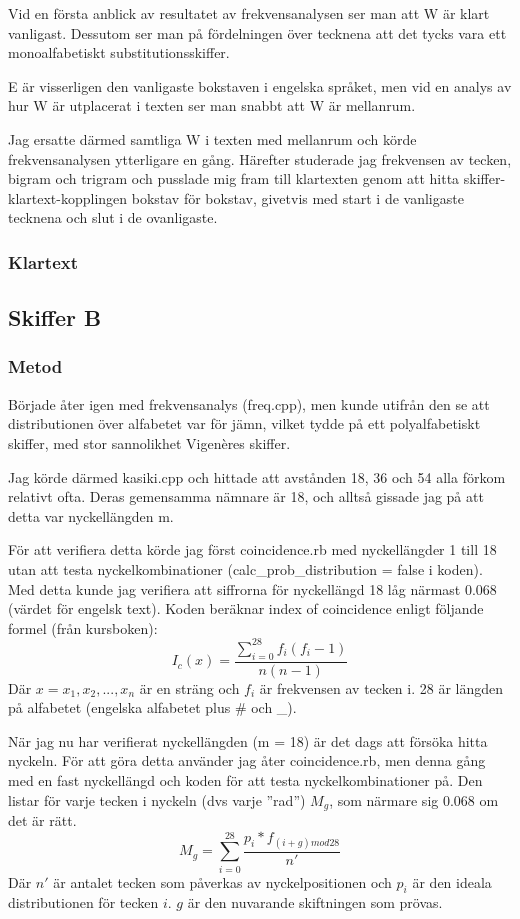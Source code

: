 \documentclass[a4paper,11pt]{article}
\begin{document}
			Vid en första anblick av resultatet av frekvensanalysen ser man att W är klart vanligast. Dessutom ser man på fördelningen över tecknena att det tycks vara ett monoalfabetiskt substitutionsskiffer.
			
			E är visserligen den vanligaste bokstaven i engelska språket, men vid en analys av hur W är utplacerat i texten ser man snabbt att W är mellanrum. 

			Jag ersatte därmed samtliga W i texten med mellanrum och körde frekvensanalysen ytterligare en gång. Härefter studerade jag frekvensen av tecken, bigram och trigram och pusslade mig fram till klartexten genom att hitta skiffer-klartext-kopplingen bokstav för bokstav, givetvis med start i de vanligaste tecknena och slut i de ovanligaste.

			\subsubsection{Klartext}
				

		\subsection{Skiffer B}
			\subsubsection{Metod}
			Började åter igen med frekvensanalys (freq.cpp), men kunde utifrån den se att distributionen över alfabetet var för jämn, vilket tydde på ett polyalfabetiskt skiffer, med stor sannolikhet Vigenères skiffer. 

			Jag körde därmed kasiki.cpp och hittade att avstånden 18, 36 och 54 alla förkom relativt ofta. Deras gemensamma nämnare är 18, och alltså gissade jag på att detta var nyckellängden m. 

			För att verifiera detta körde jag först coincidence.rb med nyckellängder 1 till 18 utan att testa nyckelkombinationer (calc\_prob\_distribution = false i koden). Med detta kunde jag verifiera att siffrorna för nyckellängd 18 låg närmast 0.068 (värdet för engelsk text). Koden beräknar index of coincidence enligt följande formel (från kursboken): \\
			$$ I_c(x) = \frac{\sum_{i=0}^{28} f_i(f_i-1)}{n(n-1)} $$
			Där $x=x_1, x_2, ..., x_n$ är en sträng och $f_i$ är frekvensen av tecken i. 28 är längden på alfabetet (engelska alfabetet plus \# och \_).

			När jag nu har verifierat nyckellängden (m = 18) är det dags att försöka hitta nyckeln. För att göra detta använder jag åter coincidence.rb, men denna gång med en fast nyckellängd och koden för att testa nyckelkombinationer på.
			Den listar för varje tecken i nyckeln (dvs varje ''rad'') $M_g$, som närmare sig 0.068 om det är rätt. 
			$$ M_g = \sum_{i=0}^{28} \frac{p_i*f_{(i+g) mod 28}}{n'} $$
			Där $n'$ är antalet tecken som påverkas av nyckelpositionen och $p_i$ är den ideala distributionen för tecken $i$. $g$ är den nuvarande skiftningen som prövas.
\end{document}
